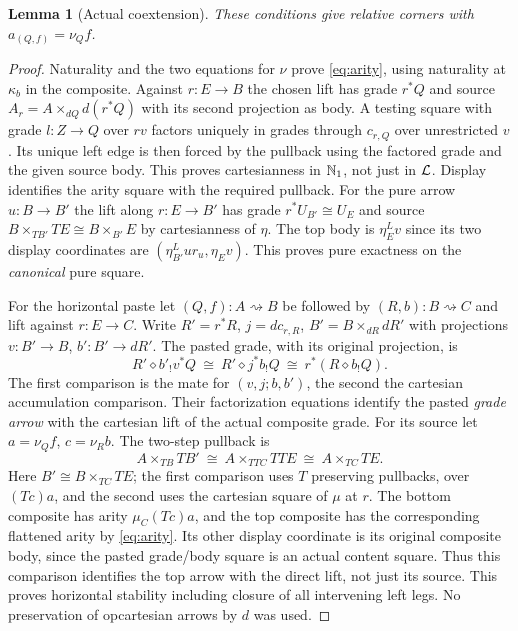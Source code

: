\documentclass[11pt]{article}
\newtheorem{lemma}[theorem]{Lemma}
\theoremstyle{definition}\newtheorem{definition}[theorem]{Definition}
\begin{document}
\begin{lemma}[Actual coextension]\label{lem:comma}
These conditions give relative corners with $a_{(Q,f)}=\nu_Q f$.
\end{lemma}
\begin{proof}
Naturality and the two equations for $\nu$ prove \eqref{eq:arity},
using naturality at $\kappa_b$ in the composite. Against $r:E\to B$
the chosen lift has grade $r^*Q$ and source
$A_r=A\times_{dQ}d(r^*Q)$ with its second projection as body.
A testing square with grade $l:Z\to Q$ over $rv$ factors uniquely
in grades through $c_{r,Q}$ over unrestricted $v$. Its unique left
edge is then forced by the pullback using the factored grade and the
given source body. This proves cartesianness in $\mathbb N_1$, not just in
$\mathcal L$. Display identifies the arity square with the required
pullback. For the pure arrow $u:B\to B'$ the lift along $r:E\to B'$
has grade $r^*U_{B'}\cong U_E$ and source
$B\times_{TB'} TE\cong B\times_{B'}E$ by cartesianness of $\eta$.
The top body is $\eta^L_E v$ since its two display coordinates are
$(\eta^L_{B'}u r_u,\eta_E v)$. This proves pure exactness on the
\emph{canonical} pure square.

For the horizontal paste let $(Q,f):A\rightsquigarrow B$ be followed
by $(R,b):B\rightsquigarrow C$ and lift against $r:E\to C$.
Write $R'=r^*R$, $j=dc_{r,R}$,
$B'=B\times_{dR}dR'$ with projections $v:B'\to B$, $b':B'\to dR'$.
The pasted grade, with its original projection, is
\[
 R'\diamond b'_!v^*Q\ \cong\ R'\diamond j^*b_!Q
                \ \cong\ r^*(R\diamond b_!Q).
\]
The first comparison is the mate for $(v,j;b,b')$, the second the
cartesian accumulation comparison. Their factorization equations
identify the pasted \emph{grade arrow} with the cartesian lift of the
actual composite grade. For its source let $a=\nu_Q f$, $c=\nu_R b$.
The two-step pullback is
\[
 A\times_{TB}TB'\ \cong\ A\times_{TTC}TTE
              \ \cong\ A\times_{TC}TE .
\]
Here $B'\cong B\times_{TC}TE$; the first comparison uses $T$ preserving
pullbacks, over $(Tc)a$, and the second uses the cartesian square
of $\mu$ at $r$. The bottom composite has arity $\mu_C(Tc)a$,
and the top composite has the corresponding flattened arity by
\eqref{eq:arity}. Its other display coordinate is its original
composite body, since the pasted grade/body square is an actual
content square. Thus this comparison identifies the top arrow with
the direct lift, not just its source. This proves horizontal stability
including closure of all intervening left legs. No preservation of
opcartesian arrows by $d$ was used.
\end{proof}
\end{document}
